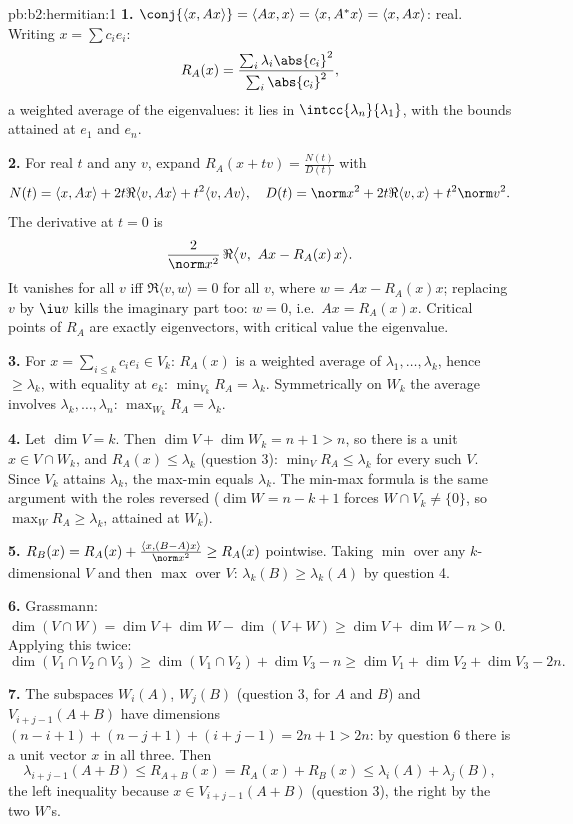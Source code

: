 \begin{solution}{pb:b2:hermitian:1}
\textbf{1.} $\conj{\langle x, Ax\rangle} = \langle Ax, x\rangle
= \langle x, A^*x\rangle = \langle x, Ax\rangle$: real. Writing
$x = \sum c_ie_i$:
\[
R_A(x) = \frac{\sum_i\lambda_i\abs{c_i}^2}
{\sum_i\abs{c_i}^2} ,
\]
a weighted average of the eigenvalues: it lies in
$\intcc{\lambda_n}{\lambda_1}$, with the bounds attained at
$e_1$ and $e_n$.

\textbf{2.} For real $t$ and any $v$, expand $R_A(x + tv) =
\frac{N(t)}{D(t)}$ with
\[
N(t) = \langle x, Ax\rangle + 2t\Re\langle v, Ax\rangle +
t^2\langle v, Av\rangle,
\quad
D(t) = \norm x^2 + 2t\Re\langle v, x\rangle + t^2\norm v^2 .
\]
The derivative at $t = 0$ is
\[
\frac{2}{\norm x^2}\,
\Re\bigl\langle v,\ Ax - R_A(x)\,x\bigr\rangle .
\]
It vanishes for all $v$ iff $\Re\langle v, w\rangle = 0$ for
all $v$, where $w = Ax - R_A(x)x$; replacing $v$ by $\iu v$
kills the imaginary part too: $w = 0$, i.e.\ $Ax = R_A(x)x$.
Critical points of $R_A$ are exactly eigenvectors, with
critical value the eigenvalue.

\textbf{3.} For $x = \sum_{i\leq k}c_ie_i \in V_k$: $R_A(x)$ is
a weighted average of $\lambda_1, \dots, \lambda_k$, hence
$\geq \lambda_k$, with equality at $e_k$: $\min_{V_k} R_A =
\lambda_k$. Symmetrically on $W_k$ the average involves
$\lambda_k, \dots, \lambda_n$: $\max_{W_k}R_A = \lambda_k$.

\textbf{4.} Let $\dim V = k$. Then $\dim V + \dim W_k = n + 1 >
n$, so there is a unit $x \in V \cap W_k$, and $R_A(x) \leq
\lambda_k$ (question 3): $\min_{V}R_A \leq \lambda_k$ for every
such $V$. Since $V_k$ attains $\lambda_k$, the max-min equals
$\lambda_k$. The min-max formula is the same argument with the
roles reversed ($\dim W = n - k + 1$ forces $W \cap V_k \neq
\{0\}$, so $\max_W R_A \geq \lambda_k$, attained at $W_k$).

\textbf{5.} $R_B(x) = R_A(x) + \frac{\langle x,
(B-A)x\rangle}{\norm x^2} \geq R_A(x)$ pointwise. Taking
$\min$ over any $k$-dimensional $V$ and then $\max$ over $V$:
$\lambda_k(B) \geq \lambda_k(A)$ by question 4.

\textbf{6.} Grassmann: $\dim(V\cap W) = \dim V + \dim W -
\dim(V + W) \geq \dim V + \dim W - n > 0$. Applying this twice:
\[
\dim(V_1\cap V_2\cap V_3)
\geq \dim(V_1\cap V_2) + \dim V_3 - n
\geq \dim V_1 + \dim V_2 + \dim V_3 - 2n .
\]

\textbf{7.} The subspaces $W_i(A)$, $W_j(B)$ (question 3, for
$A$ and $B$) and $V_{i+j-1}(A+B)$ have dimensions $(n-i+1) +
(n-j+1) + (i+j-1) = 2n + 1 > 2n$: by question 6 there is a unit
vector $x$ in all three. Then
\[
\lambda_{i+j-1}(A+B) \leq R_{A+B}(x)
= R_A(x) + R_B(x) \leq \lambda_i(A) + \lambda_j(B),
\]
the left inequality because $x \in V_{i+j-1}(A+B)$ (question
3), the right by the two $W$'s.


\end{solution}

